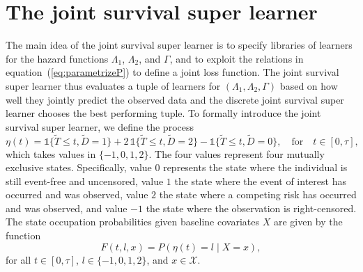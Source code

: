 \documentclass[alpha-refs]{wiley-article}
\newcommand{\1}{\mathds{1}}
\begin{document}
\section{The joint survival super learner}
\label{sec:joint-survival-super-learner}

The main idea of the joint survival super learner is to specify
libraries of learners for the hazard functions \( \Lambda_1 \), \(
\Lambda_2 \), and \( \Gamma \), and to exploit the relations in
equation~(\ref{eq:parametrizeP}) to define a joint loss function. The
joint survival super learner thus evaluates a tuple of learners for \(
(\Lambda_1, \Lambda_2, \Gamma) \) based on how well they jointly
predict the observed data and the discrete joint survival super
learner chooses the best performing tuple. To formally introduce the
joint survival super learner, we define the process
\begin{equation*}
  \eta(t) = \1\{\tilde{T} \leq t, \tilde D=1\} + 2\,\1\{\tilde{T} \leq t, \tilde
  D=2\} - \1\{\tilde{T} \leq t, \tilde D=0\},
  \quad \text{for} \quad t \in [0, \tau],
\end{equation*}
which takes values in \( \{-1,0,1,2\}\). The four values represent
four mutually exclusive states. Specifically, value \( 0 \) represents
the state where the individual is still event-free and uncensored,
value \( 1\) the state where the event of interest has occurred and
was observed, value \( 2\) the state where a competing risk has
occurred and was observed, and value \( -1\) the state where the
observation is right-censored. The state occupation probabilities
given baseline covariates \( X \) are given by the function
\begin{equation}
  \label{eq:F-def}
  F(t, l, x) = P(\eta(t) = l \mid X=x),
\end{equation}
for all \( t \in [0,\tau] \), \( l \in \{-1,0,1,2\} \), and
\( x \in \mathcal{X} \).
\end{document}
